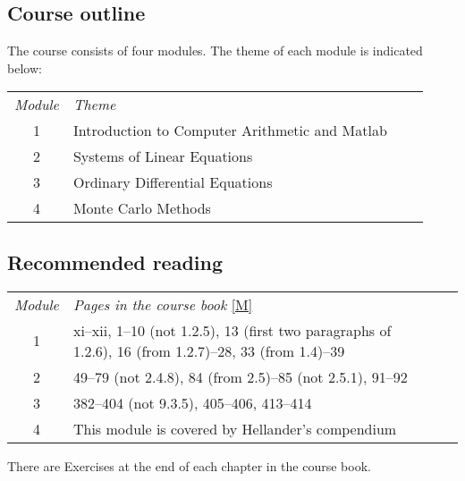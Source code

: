 \documentclass[a4paper,12pt]{article}
\begin{document}
\setlength{\leftskip}{0em}
\subsection*{Course outline}
\setlength{\leftskip}{1em}
The course consists of four modules. The theme of each module is indicated below:

\begin{center}
 	\begin{tabular}{ c m{29em}   c m{19em} } 
  	\emph{Module} & \emph{Theme}  \\
 	1 & Introduction to Computer Arithmetic and Matlab \\
	2 & Systems of Linear Equations \\
	3 & Ordinary Differential Equations \\
	4 & Monte Carlo Methods \\
	\end{tabular}
\end{center}

\setlength{\leftskip}{0em}
\subsection*{Recommended reading}

\begin{center}
 	\begin{tabular}{ c m{29em}   c m{19em} } 
  	\emph{Module} & \emph{Pages in the course book} \hyperlink{M}{[M]} \\
 	1 & xi--xii, 1--10 (not 1.2.5), 13 (first two paragraphs of 1.2.6), 16 (from 1.2.7)--28, 33 (from 1.4)--39 \\
	2 & 49--79 (not 2.4.8), 84 (from 2.5)--85 (not 2.5.1), 91--92 \\
	3 & 382--404 (not 9.3.5), 405--406, 413--414 \\
	4 & This module is covered by Hellander’s compendium \\
	\end{tabular}
\end{center}

There are Exercises at the end of each chapter in the course book. 

\setlength{\leftskip}{0em}
\end{document}
